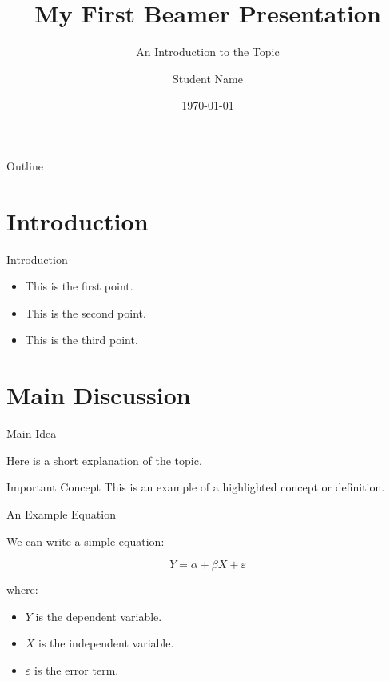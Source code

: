 \documentclass[11pt,aspectratio=169]{beamer}
\title{My First Beamer Presentation}
\subtitle{An Introduction to the Topic}
\author{Student Name}
\institute{University Name}
\date{\today}
\begin{document}
	
	\begin{frame}
		\titlepage
	\end{frame}
	
	\begin{frame}{Outline}
		\tableofcontents
	\end{frame}
	
	\section{Introduction}
	
	\begin{frame}{Introduction}
		
		\begin{itemize}
			\item This is the first point.
			\item This is the second point.
			\item This is the third point.
		\end{itemize}
		
	\end{frame}
	
	\section{Main Discussion}
	
	\begin{frame}{Main Idea}
		
		Here is a short explanation of the topic.
		
		\begin{block}{Important Concept}
			This is an example of a highlighted
			concept or definition.
		\end{block}
		
	\end{frame}
	
	\begin{frame}{An Example Equation}
		
		We can write a simple equation:
		
		\begin{equation}
			Y = \alpha + \beta X + \varepsilon
		\end{equation}
		
		where:
		\begin{itemize}
			\item $Y$ is the dependent variable.
			\item $X$ is the independent variable.
			\item $\varepsilon$ is the error term.
		\end{itemize}
		
	\end{frame}
	
\end{document}
